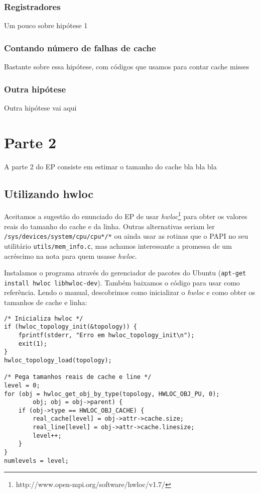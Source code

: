 \documentclass[a4paper,oneside,12pt]{article}
\begin{document}
\subsubsection{Registradores}

Um pouco sobre hipótese 1 %


\subsubsection{Contando número de falhas de cache}

Bastante sobre essa hipótese, com códigos que usamos para contar cache misses %

\subsubsection{Outra hipótese}

Outra hipótese vai aqui %

\section{Parte 2}

A parte 2 do EP consiste em estimar o tamanho do cache bla bla bla %

\subsection{Utilizando hwloc}

Aceitamos a sugestão do enunciado do EP de usar \emph{hwloc}\footnote{http://www.open-mpi.org/software/hwloc/v1.7/} para obter os valores reais do tamanho do cache e da linha. Outras alternativas seriam ler {\tt /sys/devices/system/cpu/cpu*/*} ou ainda usar as rotinas que o PAPI no seu utilitário {\tt utils/mem\_info.c}, mas achamos interessante a promessa de um acréscimo na nota para quem usasse \emph{hwloc}.

Instalamos o programa através do gerenciador de pacotes do Ubuntu ({\tt apt-get install hwloc libhwloc-dev}). Também baixamos o código para usar como referência. Lendo o manual, descobrimos como inicializar o \emph{hwloc} e como obter os tamanhos de cache e linha:

\begin{verbatim}
/* Inicializa hwloc */
if (hwloc_topology_init(&topology)) {
    fprintf(stderr, "Erro em hwloc_topology_init\n");
    exit(1);
}
hwloc_topology_load(topology);

/* Pega tamanhos reais de cache e line */
level = 0;
for (obj = hwloc_get_obj_by_type(topology, HWLOC_OBJ_PU, 0);
        obj; obj = obj->parent) {
    if (obj->type == HWLOC_OBJ_CACHE) {
        real_cache[level] = obj->attr->cache.size;
        real_line[level] = obj->attr->cache.linesize;
        level++;
    }
}
numlevels = level;
\end{verbatim}
\end{document}
